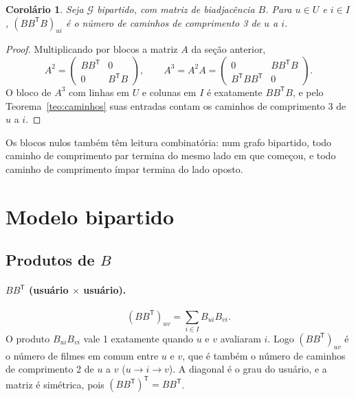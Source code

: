 \documentclass[12pt,a4paper]{article}
\newtheorem{corolario}{Corolário}
\theoremstyle{definition}
\begin{document}
\begin{corolario}\label{cor:bbtb}
Seja $\mathcal{G}$ bipartido, com matriz de biadjacência $B$. Para $u \in U$ e
$i \in I$, $(BB^{\mathsf T}B)_{ui}$ é o número de caminhos de comprimento 3
de $u$ a $i$.
\end{corolario}

\begin{proof}
Multiplicando por blocos a matriz $A$ da seção anterior,
\[
  A^2 = \begin{pmatrix} BB^{\mathsf T} & 0 \\ 0 & B^{\mathsf T}B \end{pmatrix},
  \qquad
  A^3 = A^2 A = \begin{pmatrix} 0 & BB^{\mathsf T}B \\
                               B^{\mathsf T}BB^{\mathsf T} & 0 \end{pmatrix}.
\]
O bloco de $A^3$ com linhas em $U$ e colunas em $I$ é exatamente
$BB^{\mathsf T}B$, e pelo Teorema~\ref{teo:caminhos} suas entradas contam
os caminhos de comprimento 3 de $u$ a $i$.
\end{proof}

Os blocos nulos também têm leitura combinatória: num grafo bipartido, todo
caminho de comprimento par termina do mesmo lado em que começou, e todo
caminho de comprimento ímpar termina do lado oposto.

\section{Modelo bipartido}\label{sec:bipartido}

\subsection{Produtos de $B$}

\paragraph{$BB^{\mathsf T}$ (usuário $\times$ usuário).}
\[
  (BB^{\mathsf T})_{uv} = \sum_{i \in I} B_{ui} B_{vi}.
\]
O produto $B_{ui}B_{vi}$ vale 1 exatamente quando $u$ e $v$ avaliaram $i$.
Logo $(BB^{\mathsf T})_{uv}$ é o número de filmes em comum entre $u$ e $v$,
que é também o número de caminhos de comprimento 2 de $u$ a $v$
($u \to i \to v$). A diagonal é o grau do usuário, e a matriz é simétrica,
pois $(BB^{\mathsf T})^{\mathsf T} = BB^{\mathsf T}$.
\end{document}
